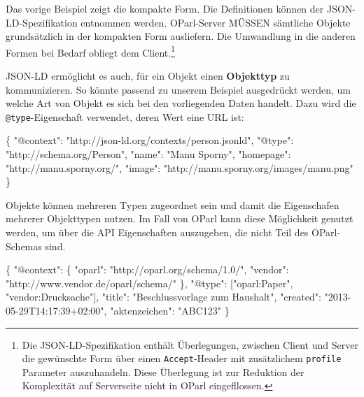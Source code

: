 \documentclass[,a4paper]{article}
\newenvironment{Shaded}{}{}
\newcommand{\DataTypeTok}[1]{\textcolor[rgb]{0.56,0.13,0.00}{{#1}}}
\newcommand{\StringTok}[1]{\textcolor[rgb]{0.25,0.44,0.63}{{#1}}}
\newcommand{\OtherTok}[1]{\textcolor[rgb]{0.00,0.44,0.13}{{#1}}}
\newcommand{\FunctionTok}[1]{\textcolor[rgb]{0.02,0.16,0.49}{{#1}}}
\begin{document}
Das vorige Beispiel zeigt die kompakte Form. Die Definitionen können der
JSON-LD-Spezifikation entnommen werden. OParl-Server MÜSSEN sämtliche
Objekte grundsätzlich in der kompakten Form ausliefern. Die Umwandlung
in die anderen Formen bei Bedarf obliegt dem Client.\footnote{Die
  JSON-LD-Spezifikation enthält Überlegungen, zwischen Client und Server
  die gewünschte Form über einen \texttt{Accept}-Header mit zusätzlichem
  \texttt{profile} Parameter auszuhandeln. Diese Überlegung ist zur
  Reduktion der Komplexität auf Serverseite nicht in OParl
  eingefllossen.}

JSON-LD ermöglicht es auch, für ein Objekt einen \textbf{Objekttyp} zu
kommunizieren. So könnte passend zu unserem Beispiel ausgedrückt werden,
um welche Art von Objekt es sich bei den vorliegenden Daten handelt.
Dazu wird die \texttt{@type}-Eigenschaft verwendet, deren Wert eine URL
ist:

\begin{Shaded}
\begin{Highlighting}[]
\FunctionTok{\{}
  \DataTypeTok{"@context"}\FunctionTok{:} \StringTok{"http://json-ld.org/contexts/person.jsonld"}\FunctionTok{,}
  \DataTypeTok{"@type"}\FunctionTok{:} \StringTok{"http://schema.org/Person"}\FunctionTok{,}
  \DataTypeTok{"name"}\FunctionTok{:} \StringTok{"Manu Sporny"}\FunctionTok{,}
  \DataTypeTok{"homepage"}\FunctionTok{:} \StringTok{"http://manu.sporny.org/"}\FunctionTok{,}
  \DataTypeTok{"image"}\FunctionTok{:} \StringTok{"http://manu.sporny.org/images/manu.png"}
\FunctionTok{\}}
\end{Highlighting}
\end{Shaded}

Objekte können mehreren Typen zugeordnet sein und damit die Eigenschafen
mehrerer Objekttypen nutzen. Im Fall von OParl kann diese Möglichkeit
genutzt werden, um über die API Eigenschaften auszugeben, die nicht Teil
des OParl-Schemas sind.

\begin{Shaded}
\begin{Highlighting}[]
\FunctionTok{\{}
  \DataTypeTok{"@context"}\FunctionTok{:} \FunctionTok{\{}
    \DataTypeTok{"oparl"}\FunctionTok{:} \StringTok{"http://oparl.org/schema/1.0/"}\FunctionTok{,}
    \DataTypeTok{"vendor"}\FunctionTok{:} \StringTok{"http://www.vendor.de/oparl/schema/"}
  \FunctionTok{\},}
  \DataTypeTok{"@type"}\FunctionTok{:} \OtherTok{[}\StringTok{"oparl:Paper"}\OtherTok{,} \StringTok{"vendor:Drucksache"}\OtherTok{]}\FunctionTok{,}
  \DataTypeTok{"title"}\FunctionTok{:} \StringTok{"Beschlussvorlage zum Haushalt"}\FunctionTok{,}
  \DataTypeTok{"created"}\FunctionTok{:} \StringTok{"2013-05-29T14:17:39+02:00"}\FunctionTok{,}
  \DataTypeTok{"aktenzeichen"}\FunctionTok{:} \StringTok{"ABC123"}
\FunctionTok{\}}
\end{Highlighting}
\end{Shaded}
\end{document}

